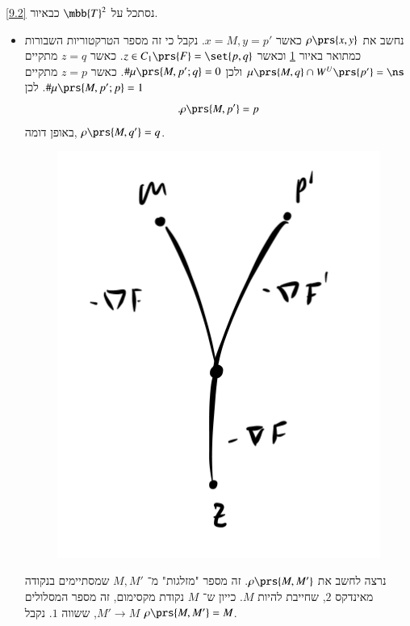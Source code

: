 \documentclass[a4paper,10pt,twoside,openany]{book}
\begin{document}
\begin{example}
נסתכל על
$\mbb{T}^2$
כבאיור
\ref{9.2}.

\begin{itemize}
\item
נחשב את
$\rho\prs{x,y}$
כאשר
$x = M, y = p'$.
נקבל כי זה מספר הטרקטוריות השבורות כמתואר באיור
\ref{9.3}
וכאשר
$z \in C_1\prs{F} = \set{p,q}$.
כאשר
$z = q$
מתקיים
$\mu\prs{M,q} \cap W^U\prs{p'} = \ns$
ולכן
$\# \mu\prs{M,p';q} = 0$.
כאשר
$z = p$
מתקיים
$\# \mu\prs{M, p';p} = 1$.
לכן
\[\text{.} \rho\prs{M, p'} = p\]
באופן דומה,
$\rho\prs{M,q'} = q$.

\begin{figure}
\centering
\includegraphics[scale=0.5]{sources/9.3}
\caption{}
\label{9.3}
\end{figure}

נרצה לחשב את
$\rho\prs{M,M'}$.
זה מספר "מזלגות" מ־%
$M,M'$
שמסתיימים בנקודה מאינדקס
$2$,
שחייבת להיות
$M$.
כייון ש־%
$M$
נקודת מקסימום, זה מספר המסלולים
$M' \to M$,
ששווה
$1$.
נקבל
$\rho\prs{M,M'} = M$.


\end{itemize}
\end{example}
\end{document}
